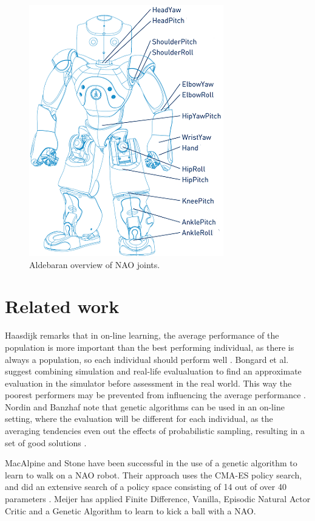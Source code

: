 \documentclass{article}
\begin{document}
\begin{figure}
	\center
	\includegraphics[scale=.85]{images/naospecsJoints}
	\caption{Aldebaran overview of NAO joints.}
	\label{fig:joints}
\end{figure}

\section{Related work}
Haasdijk remarks that in on-line learning, the average
performance of the population is more important than the best performing
individual, as there is always a population, so each individual should perform
well \cite{haasdijk2012never}. Bongard et al. suggest combining simulation
and real-life evalualuation to find an approximate evaluation in the simulator
before assessment in the real world. This way the poorest performers may be
prevented from influencing the average performance \cite{bongard2006resilient}.
Nordin and Banzhaf note that genetic algorithms can be used in an on-line
setting, where the evaluation will be different for each individual, as the
averaging tendencies even out the effects of probabilistic sampling, resulting
in a set of good solutions \cite{nordin1997line}.

MacAlpine and Stone have been successful in the use of a genetic algorithm
to learn to walk on a NAO robot. Their approach uses the CMA-ES policy search,
and did an extensive search of a policy space consisting of 14 out of over 40
parameters \cite{macalpineusing}.
Meijer has applied Finite Difference, Vanilla, Episodic
Natural Actor Critic and a Genetic Algorithm to learn to kick a ball with a
NAO\cite{meijer2012getting}.
\end{document}
